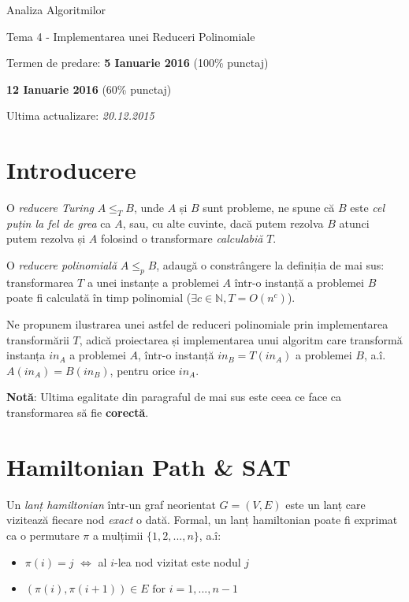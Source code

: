 \documentclass[12pt]{article}
\begin{document}
\begin{titlepage}
  \centering
  \vspace*{2cm}
  {\Large Analiza Algoritmilor}

  {\Large Tema 4 - Implementarea unei Reduceri Polinomiale}
  \vspace{2cm}

  {\large Termen de predare: {\bf 5 Ianuarie 2016} (100\% punctaj)}

  {\large \hspace{4.2cm} {\bf 12 Ianuarie 2016} (60\% punctaj)}
  \vspace{1cm}

  Ultima actualizare: \color{red} \emph{20.12.2015}

  \vfill
\end{titlepage}

\section{Introducere}
O \emph{reducere Turing} $A \leq_T B$, unde $A$ și $B$ sunt probleme,
ne spune că $B$ este \emph{cel puțin la fel de grea} ca $A$, sau, cu alte
cuvinte, dacă putem rezolva $B$ atunci putem rezolva și $A$ folosind o
transformare \emph{calculabiă} $T$.

O \emph{reducere polinomială}\cite{1} $A \leq_p B$, adaugă o
constrângere la definiția de mai sus: transformarea $T$ a unei instanțe a
problemei $A$ într-o instanță a problemei $B$ poate fi calculată în timp
polinomial ($\exists c \in \mathbb{N}, T = O(n^c)$).

Ne propunem ilustrarea unei astfel de reduceri polinomiale prin implementarea
transformării $T$, adică proiectarea și implementarea unui algoritm care
transformă instanța $in_A$ a problemei $A$, într-o instanță $in_B = T(in_A)$ a
problemei $B$, a.î. $A(in_A) = B(in_B)$, pentru orice $in_A$.

{\bf Notă}: Ultima egalitate din paragraful de mai sus este ceea ce face ca
transformarea să fie {\bf corectă}.

\section{Hamiltonian Path \& SAT}
Un \emph{lanț hamiltonian}\cite{2} într-un graf neorientat $G = (V, E)$ este un
lanț care vizitează fiecare nod \emph{exact} o dată.
Formal, un lanț hamiltonian poate fi exprimat ca o permutare $\pi$ a mulțimii
$\{1, 2, ..., n\}$, a.î:

\begin{itemize}
  \setlength{\itemsep}{0em}
  \item $\pi(i) = j$ $\iff$ al $i$-lea nod vizitat este nodul $j$
  \item $(\pi(i), \pi(i + 1)) \in E \mbox{ for } i = 1,...,n-1$
\end{itemize}
\end{document}
